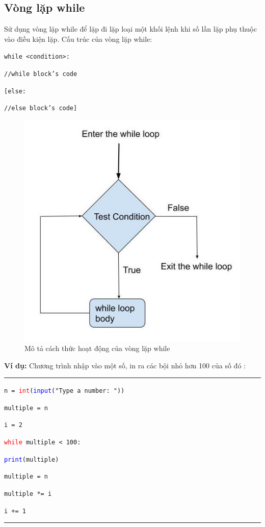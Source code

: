\subsection{Vòng lặp while}
\label{while}
Sử dụng vòng lặp while để lặp đi lặp loại một khối lệnh khi số lần lặp phụ thuộc vào điều kiện lặp. Cấu trúc của vòng lặp while:\par
\texttt{while <condition>:}\par
\qquad \texttt{//while block's code}\par
\texttt{[else:}\par
\qquad \texttt{//else block's code]}\par
\begin{figure}[h]
	\centering
	\includegraphics[width=0.5\linewidth]{img/while}
	\caption{Mô tả cách thức hoạt động của vòng lặp while}
	\label{fig:while}
\end{figure}
\newpage
\textbf{Ví dụ:} Chương trình nhập vào một số, in ra các bội nhỏ hơn 100 của số đó :\\
\rule{\linewidth}{0.2mm}\par
\begin{linenumbers}
	\texttt{n = \textcolor{red}{int}(\textcolor{blue}{input}("Type a number: "))}\par
	\texttt{multiple = n}\par
	\texttt{i = 2}\par
	\texttt{\textcolor{red}{while} multiple < 100:}\par
	\qquad \texttt{\textcolor{blue}{print}(multiple)}\par
	\qquad\texttt{multiple = n}\par
	\qquad\texttt{multiple *= i}\par
	\qquad\texttt{i += 1}\par
\end{linenumbers}
\rule{\linewidth}{0.2mm}\par
